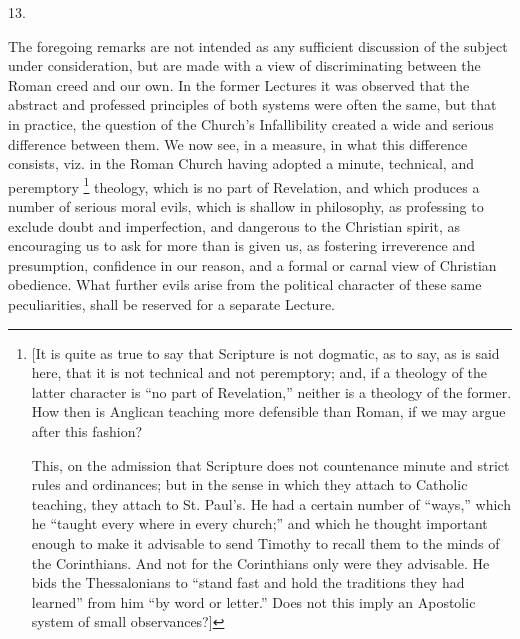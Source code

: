 13.

The foregoing remarks are not intended as any sufficient discussion
of the subject under consideration, but are made with a view of
discriminating between the Roman creed and our own. In the former
Lectures it was observed that the abstract and professed principles of
both systems were often the same, but that in practice, the question
of the Church's Infallibility created a wide and serious difference
between them. We now see, in a measure, in what this difference
consists, viz. in the Roman Church having adopted a minute, technical,
and peremptory \footnote{[It is quite as true to say that Scripture
is not dogmatic, as to say, as is said here, that it is not technical
and not peremptory; and, if a theology of the latter character is
``no part of Revelation,'' neither is a theology of the
former. How then is Anglican teaching more defensible than Roman, if
we may argue after this fashion?

This, on the admission that Scripture does not countenance minute
and strict rules and ordinances; but in the sense in which they attach
to Catholic teaching, they attach to St. Paul's. He had a certain
number of ``ways,'' which he ``taught every where in every
church;'' and which he thought important enough to make it
advisable to send Timothy to recall them to the minds of the
Corinthians. And not for the Corinthians only were they advisable. He
bids the Thessalonians to ``stand fast and hold the traditions
they had learned'' from him ``by word or letter.'' Does
not this imply an Apostolic system of small observances?]}
theology, which is no part of Revelation, and which produces a number
of serious moral evils, which is shallow in philosophy, as professing
to exclude doubt and imperfection, and dangerous to the Christian
spirit, as encouraging us to ask for more than is given us, as
fostering irreverence and presumption, confidence in our reason, and a
formal or carnal view of Christian obedience. What further evils arise
from the political character of these same peculiarities, shall be
reserved for a separate Lecture.


